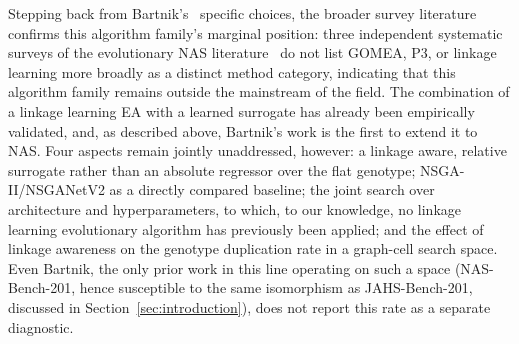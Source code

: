 Stepping back from Bartnik's~\citep{bartnik2026evolutionary} specific choices, the broader survey literature confirms this algorithm family's marginal position: three independent systematic surveys of the evolutionary NAS literature~\citep{liu2023survey, white2023insights, ozcelik2026survey} do not list GOMEA, P3, or linkage learning more broadly as a distinct method category, indicating that this algorithm family remains outside the mainstream of the field. The combination of a linkage learning EA with a learned surrogate has already been empirically validated, and, as described above, Bartnik's work is the first to extend it to NAS. Four aspects remain jointly unaddressed, however: a linkage aware, relative surrogate rather than an absolute regressor over the flat genotype; NSGA-II/NSGANetV2 as a directly compared baseline; the joint search over architecture and hyperparameters, to which, to our knowledge, no linkage learning evolutionary algorithm has previously been applied; and the effect of linkage awareness on the genotype duplication rate in a graph-cell search space. Even Bartnik, the only prior work in this line operating on such a space (NAS-Bench-201, hence susceptible to the same isomorphism as JAHS-Bench-201, discussed in Section~\ref{sec:introduction}), does not report this rate as a separate diagnostic.

